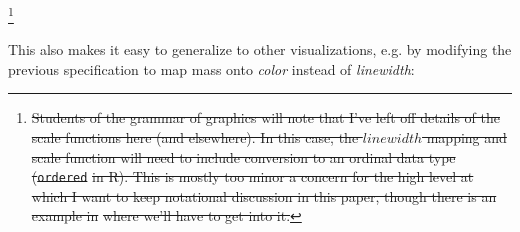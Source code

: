 \documentclass[journal]{vgtc}                     %
\providecommand{\DIFdel}[1]{{\protect\color{red}\sout{#1}}}                      %
\providecommand{\DIFdelbegin}{} %
\providecommand{\DIFdelend}{} %
\begin{document}
\DIFdelbegin \footnote{\DIFdel{Students of the grammar of graphics will note that I've left off details of the scale functions here (and elsewhere). In this case, the $linewidth$ mapping and scale function will need to include conversion to an ordinal data type (}\texttt{\DIFdel{ordered}} %
\DIFdel{in R). This is mostly too minor a concern for the high level at which I want to keep notational discussion in this paper, though there is an example in }%
\DIFdel{where we'll have to get into it.}} %
\addtocounter{footnote}{-1}%
\DIFdelend %
This also makes it easy to generalize to other visualizations, e.g. by modifying the previous specification to map mass onto \textit{color} instead of \textit{linewidth}:
\end{document}

